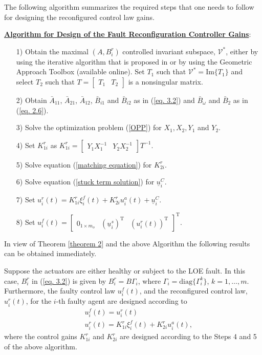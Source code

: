 \documentclass[12pt,draftcls,onecolumn]{IEEEtran}
\begin{document}
The following algorithm summarizes the required steps that one needs to follow for designing the reconfigured control law gains.\par
\underline{\textbf{Algorithm for Design of the Fault Reconfiguration Controller Gains}}:\par
\begin{itemize}
\item [1)] Obtain the maximal $(A,B_i^r)$ controlled invariant subspace, $\mathcal{V}^*$, either by using the iterative algorithm that is proposed in \cite{Basile92} or by using the  Geometric Approach Toolbox\cite{Basil:2010:MISC} (available online). Set $T_1$ such that $\mathcal{V}^*=\text{Im}\{T_1\}$ and select $T_2$ such that $T=\begin{bmatrix}T_1&T_2\end{bmatrix}$ is a nonsingular matrix.
\item [2)] Obtain $\bar A_{11}$, $\bar A_{21}$, $\bar A_{12}$, $\bar B_{i1}$ and $\bar B_{i2}$ as in (\ref{eq. 3.2}) and $\bar B_{\omega}$ and $\bar B_2$   as in (\ref{eq. 2.6}).
\item [3)] Solve the optimization problem (\ref{OPP}) for $X_1,X_2,Y_1$ and $Y_2$.
\item [4)] Set $K_{1i}^{r}$ as $K_{1i}^{r}=\begin{bmatrix}
Y_1X_1^{-1}&Y_2X_2^{-1}
\end{bmatrix}T^{-1}$.
\item [5)] Solve    equation (\ref{matching equation}) for $K_{2i}^{r}$.
\item [6)] Solve equation (\ref{stuck term solution}) for $\underline u_i^C$.
\item [7)] Set $u_i^{r}(t)=K_{1i}^r\xi_i^f(t)+K_{2i}^ru_i^a(t)+\underline{u}_i^C$.
\item [8)] Set $u_i^f(t)=\begin{bmatrix}0_{1\times m_o}&(\underline u_i^s)^\text{T}&(u_i^{r}(t))^\text{T}\end{bmatrix}^\text{T}$.
\end{itemize}\par
In view of  Theorem \ref{theorem 2} and the above Algorithm the following  results can be obtained immediately.
\begin{corollaries}\label{only loe}
Suppose the actuators are either healthy or subject to the LOE fault. 
In this case, $B_i^r$ in  (\ref{eq. 3.2}) is given by $B_i^r=B\Gamma_i$, where $\Gamma_i=\text{diag}\{\Gamma_i^k\}$, $k=1,\dots,m$. Furthermore,  the faulty control law $u_i^f(t)$, and the reconfigured control law, $u_i^r(t)$,  for the $i$-th faulty agent   are designed according to
 \begin{eqnarray*}
&& u_i^f(t)=u_i^r(t)\\
&&u_i^r(t)=K_{1i}^r\xi_i^f(t)+K_{2i}^ru_i^a(t),
\end{eqnarray*}
 where the control gains $K_{1i}^r$ and $K_{2i}^r$ are designed according to the Steps 4 and 5 of the above algorithm.
\end{corollaries}
\end{document}
